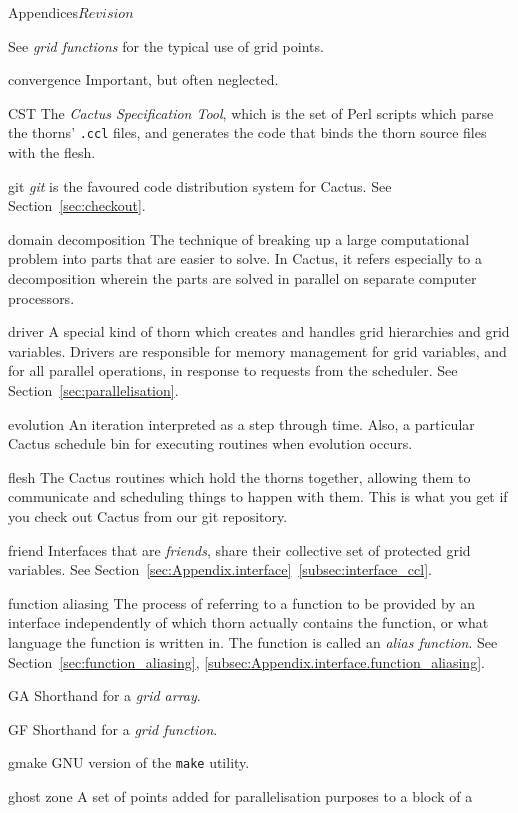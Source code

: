\begin{cactuspart}{Appendices}{}{$Revision$}
\begin{Lentry}
  See \textit{grid functions} for the typical use of grid points.
\item[convergence]
  Important, but often neglected.
\item[CST]
  The \textit{Cactus Specification Tool}, which is the set of Perl
  scripts which parse the thorns' \texttt{.ccl} files, and generates the
  code that binds the thorn source files with the flesh.
\item[git]
  \textit{git} is the favoured code distribution system for Cactus.
  See Section~\ref{sec:checkout}.
\item[domain decomposition]
  The technique of breaking up a large computational problem into parts
  that are easier to solve.  In Cactus, it refers especially to a decomposition
  wherein the parts are solved in parallel on separate computer processors.
\item[driver]
  A special kind of thorn which creates and handles grid hierarchies 
  and grid variables.
  Drivers are responsible for memory management for grid variables,
  and for all parallel operations, in response to requests from the
  scheduler.
  See Section~\ref{sec:parallelisation}.
\item[evolution]
  An iteration interpreted as a step through time.  Also, a particular Cactus
  schedule bin for executing routines when evolution occurs.
\item[flesh]
  The Cactus routines which hold the thorns together, allowing them to 
  communicate and scheduling things to happen with them. This is what you
  get if you check out Cactus from our git repository.
\item[friend] Interfaces that are \textit{friends}, share their collective
  set of protected grid variables.
  See Section~\ref{sec:Appendix.interface}~\ref{subsec:interface_ccl}.
\item[function aliasing]
  The process of referring to a function to be provided by an interface
  independently of which thorn actually contains the function, or what
  language the function is written in.  The function is called an
  \textit{alias function}.  See Section~\ref{sec:function_aliasing},
  \ref{subsec:Appendix.interface.function_aliasing}.
\item[GA]
  Shorthand for a \textit{grid array}.
\item[GF]
  Shorthand for a \textit{grid function}.
\item[gmake]
  GNU version of the {\tt make} utility.
\item[ghost zone] 
  A set of points added for parallelisation purposes to a block of a

\end{Lentry}
\end{cactuspart}
